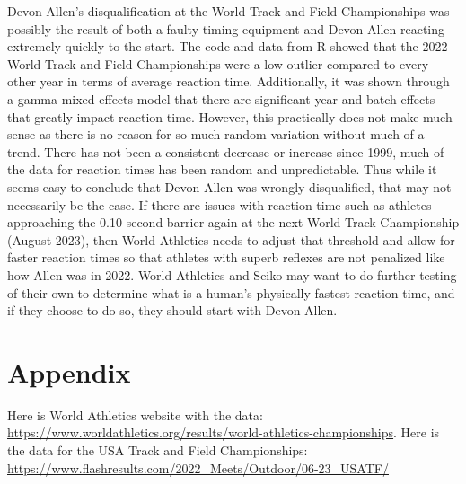 \documentclass[12pt, letterpaper, titlepage]{article}
\begin{document}
Devon Allen's disqualification at the World Track and Field Championships was
possibly the result of both a faulty timing equipment and Devon Allen
reacting extremely quickly to the start.  The code and data from R showed that
the 2022 World Track and Field Championships were a low outlier compared to
every other year in terms of average reaction time.  Additionally, it was shown
through a gamma mixed effects model that there are significant year and batch
effects that greatly impact reaction time.  However, this practically does not make much sense
as there is no reason for so much random variation without much of a trend.
There has not been a consistent decrease or increase since 1999, much of the data
for reaction times has been random and unpredictable.  Thus while it seems easy
to conclude that Devon Allen was wrongly disqualified, that may not necessarily
be the case.  If there are issues with reaction time such as athletes approaching the 0.10 
second barrier again at the next World Track Championship (August 2023), then World Athletics 
needs to adjust that threshold and allow for faster reaction times so that athletes with superb 
reflexes are not penalized like how Allen was in 2022.  World Athletics and Seiko 
may want to do further testing of their own to determine what is a human's physically
fastest reaction time, and if they choose to do so, they should start with Devon
Allen.



\section{Appendix}
\label{sec:appendix}
Here is World Athletics website with the data: \url{https://www.worldathletics.org/results/world-athletics-championships}.
Here is the data for the USA Track and Field Championships: \url{https://www.flashresults.com/2022_Meets/Outdoor/06-23_USATF/}




\end{document}
